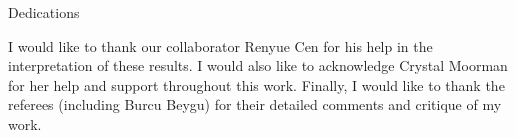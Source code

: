 \begin{preamble}

\iffinal{}{\newpage}


\begin{DUTdedications}
\begin{center}
Dedications
\end{center}
\end{DUTdedications}

\iffinal{}{\newpage}


\begin{acknowledgments}


I would like to thank our collaborator Renyue Cen for his help in the 
interpretation of these results.  I would also like to acknowledge Crystal 
Moorman for her help and support throughout this work.  Finally, I would like to 
thank the referees (including Burcu Beygu) for their detailed comments and 
critique of my work.





%
%


\end{acknowledgments}
\end{preamble}

